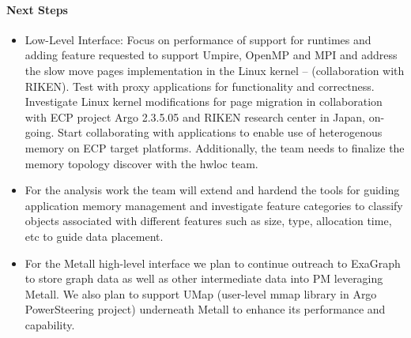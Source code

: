 \paragraph{Next Steps}
\begin{itemize}
\item  Low-Level Interface: Focus on performance of support for runtimes and adding feature requested to support Umpire, OpenMP and MPI and address the slow move pages implementation in the Linux kernel – (collaboration with RIKEN). Test with proxy applications for functionality and correctness. Investigate Linux kernel modifications for page migration in collaboration with ECP project Argo 2.3.5.05 and RIKEN research center in Japan, on-going. Start collaborating with applications to enable use of heterogenous memory on ECP target platforms. Additionally, the team needs to finalize the memory topology discover with the hwloc team.
\item For the analysis work the team will extend and hardend the tools for guiding application memory management and investigate feature categories to classify objects associated with different features such as size, type, allocation time, etc to guide data placement.
\item For the Metall high-level interface we plan to continue outreach to ExaGraph to store graph data as well as other intermediate data into PM leveraging Metall. We also plan to support UMap (user-level mmap library in Argo PowerSteering project) underneath Metall to enhance its performance and capability.
\end{itemize}


